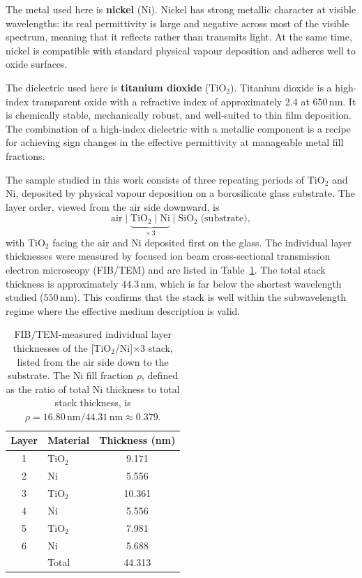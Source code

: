 The metal used here is \textbf{nickel} (Ni). Nickel has strong metallic
character at visible wavelengths: its real permittivity is large and negative
across most of the visible spectrum, meaning that it reflects rather than
transmits light. At the same time, nickel is compatible with standard physical
vapour deposition and adheres well to oxide surfaces.

The dielectric used here is \textbf{titanium dioxide} (TiO$_2$). Titanium
dioxide is a high-index transparent oxide with a refractive index of
approximately 2.4 at $650$\,nm. It is chemically stable, mechanically robust,
and well-suited to thin film deposition. The combination of a high-index
dielectric with a metallic component is a recipe for achieving sign changes in
the effective permittivity at manageable metal fill fractions.

The sample studied in this work consists of three repeating periods of
TiO$_2$ and Ni, deposited by physical vapour deposition on a borosilicate
glass substrate. The layer order, viewed from the air side downward, is
\begin{equation}
  \text{air} \;\Big|\;
  \underbrace{\text{TiO}_2 \;\Big|\; \text{Ni}}_{\times\,3} \;\Big|\;
  \text{SiO}_2 \;\text{(substrate)},
  \label{eq:ch1_stack}
\end{equation}
with TiO$_2$ facing the air and Ni deposited first on the glass. The
individual layer thicknesses were measured by focused ion beam cross-sectional
transmission electron microscopy (FIB/TEM) and are listed in
Table~\ref{tab:ch1_thicknesses}. The total stack thickness is approximately
$44.3$\,nm, which is far below the shortest wavelength studied ($550$\,nm).
This confirms that the stack is well within the subwavelength regime where the
effective medium description is valid.

\begin{table}[h]
\centering
\caption{FIB/TEM-measured individual layer thicknesses of the
  [TiO$_2$/Ni]$\times$3 stack, listed from the air side down to the substrate.
  The Ni fill fraction $\rho$, defined as the ratio of total Ni thickness to
  total stack thickness, is $\rho = 16.80\,\mathrm{nm} /
  44.31\,\mathrm{nm} \approx 0.379$.}
\label{tab:ch1_thicknesses}
\begin{tabular}{clc}
\toprule
Layer & Material & Thickness (nm) \\
\midrule
1 & TiO$_2$ & 9.171  \\
2 & Ni       & 5.556  \\
3 & TiO$_2$ & 10.361 \\
4 & Ni       & 5.556  \\
5 & TiO$_2$ & 7.981  \\
6 & Ni       & 5.688  \\
\midrule
  & Total    & 44.313 \\
\bottomrule
\end{tabular}
\end{table}

